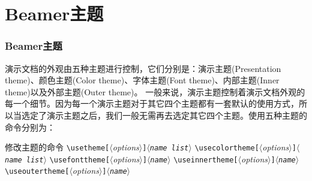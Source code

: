 \documentclass{beamer}
\newcommand\m[1]{\mbox{$\langle${\rmfamily\textit{#1}\/}$\rangle$}}
\newcommand{\marg}[1]{{\tt\string{}\m{#1}{\tt\string}}}
\newcommand{\oarg}[1]{{\tt[}\m{#1}{\tt]}}
\begin{document}
\section{Beamer主题}
\begin{frame}[fragile]
\frametitle{Beamer主题}
演示文档的外观由五种主题进行控制，它们分别是：演示主题(Presentation theme)、颜色主题(Color theme)、字体主题(Font theme)、内部主题(Inner theme)以及外部主题(Outer theme)。
一般来说，演示主题控制着演示文档外观的每一个细节。因为每一个演示主题对于其它四个主题都有一套默认的使用方式，所以当选定了演示主题之后，我们一般无需再去选定其它四个主题。使用五种主题的命令分别为：
\begin{block}{修改主题的命令}
\verb|\usetheme|\oarg{options}\marg{name list}
\verb|\usecolortheme|\oarg{options}\marg{name list}
\verb|\usefonttheme|\oarg{options}\marg{name}
\verb|\useinnertheme|\oarg{options}\marg{name}
\verb|\useoutertheme|\oarg{options}\marg{name}
\end{block}
\end{frame}

\end{document}
